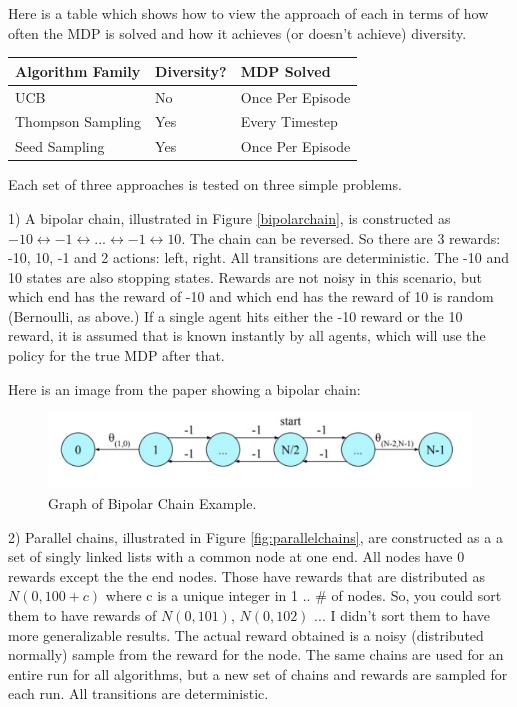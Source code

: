 \documentclass{article}
\begin{document}
Here is a table which shows how to view the approach of each in terms of how often the MDP is solved and how it achieves (or doesn't achieve) diversity.

\begin{table}[ht]
\centering
\begin{tabular}{|lll|} 
\hline 
Algorithm Family   & Diversity?       & MDP Solved  \\ 
\hline 
UCB     & No       & Once Per Episode \\ 
Thompson Sampling     & Yes      & Every Timestep \\ 
Seed Sampling     & Yes       & Once Per Episode \\ 
   \hline
\end{tabular}
\end{table}

Each set of three approaches is tested on three simple problems.

1) A bipolar chain, illustrated in Figure \ref{bipolarchain}, is constructed as $-10 \longleftrightarrow -1 \longleftrightarrow ... \longleftrightarrow -1 \longleftrightarrow 10$. The chain can be reversed. So there are 3 rewards: -10, 10, -1 and 2 actions: left, right. All transitions are deterministic. The -10 and 10 states are also stopping states. Rewards are not noisy in this scenario, but which end has the reward of -10 and which end has the reward of 10 is random (Bernoulli, as above.) If a single agent hits either the -10 reward or the 10 reward, it is assumed that is known instantly by all agents, which will use the policy for the true MDP after that. 

Here is an image from the paper showing a bipolar chain:

\begin{figure}[htbp!]
  \centering
\includegraphics[scale=.25]{bipolarchain.png}

  \caption{Graph of Bipolar Chain Example.}
 \label{fig:bipolarchain}
\end{figure}
2) Parallel chains, illustrated in Figure \ref{fig:parallelchains}, are constructed as a a set of singly linked lists with a common node at one end. All nodes have 0 rewards except the the end nodes. Those have  rewards that are distributed as $N(0,100+c)$ where c is a unique integer in 1 .. \# of nodes. So, you could sort them to have rewards of $N(0,101)$, $N(0,102)$ ... I didn't sort them to have more generalizable results. The actual reward obtained is a noisy (distributed normally) sample from the reward for the node.  The same chains are used for an entire run for all algorithms, but a new set of chains and rewards are sampled for each run. All transitions are deterministic.
\end{document}
